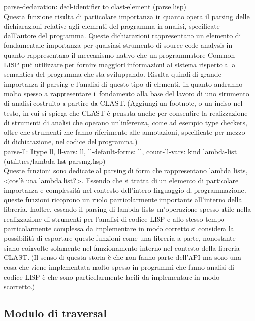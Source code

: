 parse-declaration: decl-identifier to clast-element (parse.lisp)\\

Questa funzione risulta di particolare importanza in quanto opera il parsing delle dichiarazioni relative agli elementi del programma in analisi, specificate dall'autore del programma. Queste dichiarazioni rappresentano un elemento di fondamentale importanza per qualsiasi strumento di source code analysis in quanto rappresentano il meccanismo nativo che un programmatore Common LISP può utilizzare per fornire maggiori informazioni al sistema rispetto alla semantica del programma che sta sviluppando. Risulta quindi di grande importanza il parsing e l'analisi di questo tipo di elementi, in quanto andranno molto spesso a rappresentare il fondamento alla base del lavoro di uno strumento di analisi costruito a partire da CLAST. (Aggiungi un footnote, o un inciso nel testo, in cui si spiega che CLAST è pensata anche per consentire la realizzazione di strumenti di analisi che operano un'inferenza, come ad esempio type checkers, oltre che strumenti che fanno riferimento alle annotazioni, specificate per mezzo di dichiarazione, nel codice del programma.)\\

parse-ll: lltype ll, ll-vars: ll, ll-default-forms: ll, count-ll-vars: kind lambda-list (utilities/lambda-list-parsing.lisp)\\

Queste funzioni sono dedicate al parsing di form che rappresentano lambda lists, <cos'è una lambda list?>. Essendo che si tratta di un elemento di particolare importanza e complessità nel contesto dell'intero linguaggio di programmazione, queste funzioni ricoprono un ruolo particolarmente importante all'interno della libreria. Inoltre, essendo il parsing di lambda lists un'operazione spesso utile nella realizzazione di strumenti per l'analisi di codice LISP e allo stesso tempo particolarmente complessa da implementare in modo corretto si considera la possibilità di esportare queste funzioni come una libreria a parte, nonostante siano coinvolte solamente nel funzionamento interno nel contesto della libreria CLAST. (Il senso di questa storia è che non fanno parte dell'API ma sono una cosa che viene implementata molto spesso in programmi che fanno analisi di codice LISP è che sono particolarmente facili da implementare in modo scorretto.)

\subsection{Modulo di traversal}

